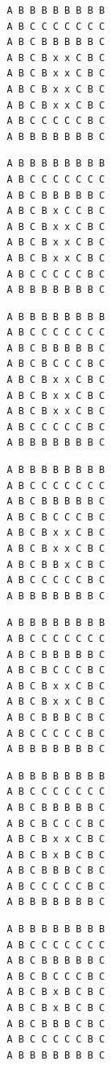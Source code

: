 { \begin{verbatim}
         A B B B B B B B B
         A B C C C C C C C
         A B C B B B B B C
         A B C B x x C B C
         A B C B x x C B C
         A B C B x x C B C
         A B C B x x C B C
         A B C C C C C B C
         A B B B B B B B C
\end{verbatim} }

{ \begin{verbatim}
         A B B B B B B B B
         A B C C C C C C C
         A B C B B B B B C
         A B C B x C C B C
         A B C B x x C B C
         A B C B x x C B C
         A B C B x x C B C
         A B C C C C C B C
         A B B B B B B B C
\end{verbatim} }

{ \begin{verbatim}
         A B B B B B B B B
         A B C C C C C C C
         A B C B B B B B C
         A B C B C C C B C
         A B C B x x C B C
         A B C B x x C B C
         A B C B x x C B C
         A B C C C C C B C
         A B B B B B B B C
\end{verbatim} }

{ \begin{verbatim}
         A B B B B B B B B
         A B C C C C C C C
         A B C B B B B B C
         A B C B C C C B C
         A B C B x x C B C
         A B C B x x C B C
         A B C B B x C B C
         A B C C C C C B C
         A B B B B B B B C
\end{verbatim} }

{ \begin{verbatim}
         A B B B B B B B B
         A B C C C C C C C
         A B C B B B B B C
         A B C B C C C B C
         A B C B x x C B C
         A B C B x x C B C
         A B C B B B C B C
         A B C C C C C B C
         A B B B B B B B C
\end{verbatim} }

{ \begin{verbatim}
         A B B B B B B B B
         A B C C C C C C C
         A B C B B B B B C
         A B C B C C C B C
         A B C B x x C B C
         A B C B x B C B C
         A B C B B B C B C
         A B C C C C C B C
         A B B B B B B B C
\end{verbatim} }

{ \begin{verbatim}
         A B B B B B B B B
         A B C C C C C C C
         A B C B B B B B C
         A B C B C C C B C
         A B C B x B C B C
         A B C B x B C B C
         A B C B B B C B C
         A B C C C C C B C
         A B B B B B B B C
\end{verbatim} }

